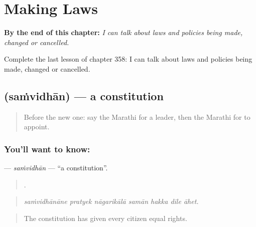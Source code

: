 
\chapter{Making Laws}
\label{ch:mr-making-laws}

\begin{chapteropening}
\textbf{By the end of this chapter:} \emph{I can talk about laws and policies being made, changed or cancelled.}

Complete the last lesson of chapter 358: I can talk about laws and policies being made, changed or cancelled.
\end{chapteropening}

\section[\texorpdfstring{\mr{संविधान} (saṁvidhān)}{संविधान (saṁvidhān)}]{ (saṁvidhān) — a constitution}

\label{lesson:MR-C358-samvidhan}



\begin{quote}
Before the new one: say the Marathi for a leader, then the Marathi for to appoint.
\end{quote}

\subsection*{You'll want to know: }
\textbf{} — \emph{saṁvidhān} — \textquotedblleft{}a constitution\textquotedblright{}.

\begin{quote}
      .
\end{quote}

\begin{quote}
\emph{saṁvidhānāne pratyek nāgarikālā samān hakka dile āhet.}
\end{quote}

\begin{quote}
The constitution has given every citizen equal rights.
\end{quote}

